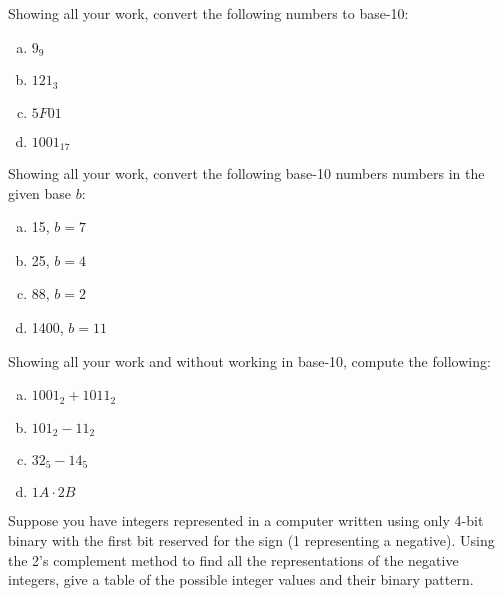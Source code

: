 \documentclass[11pt,letterpaper]{article}
\begin{document}

 Showing all your work, convert the following numbers to base-10:
	\begin{enumerate}[(a)]
	\item $9_9$
	\item $121_3$
	\item $5F01$
	\item $1001_{17}$
	\end{enumerate}



\newpage



 Showing all your work, convert the following base-10 numbers numbers in the given base $b$:
	\begin{enumerate}[(a)]
	\item 15, $b= 7$
	\item 25, $b= 4$
	\item 88, $b= 2$
	\item 1400, $b= 11$
	\end{enumerate}



\newpage



 Showing all your work and without working in base-10, compute the following:
	\begin{enumerate}[(a)]
	\item $1001_2 + 1011_2$
	\item $101_2 - 11_2$
	\item $32_5 - 14_5$
	\item $1A \cdot 2B$
	\end{enumerate}



\newpage



 Suppose you have integers represented in a computer written using only 4-bit binary with the first bit reserved for the sign (1 representing a negative). Using the 2's complement method to find all the representations of the negative integers, give a table of the possible integer values and their binary pattern. 
\end{document}
